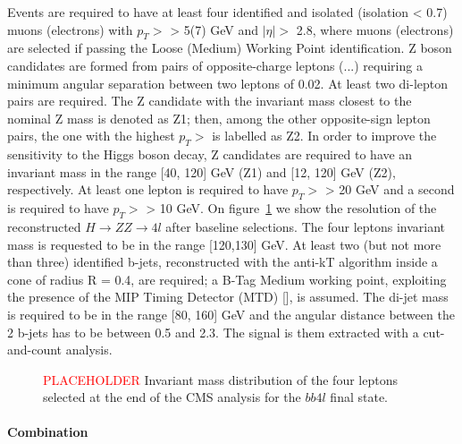 Events are required to have at least four identified and isolated (isolation < 0.7) muons (electrons) with $p_T >$ > 5(7) GeV and $|\eta| >$ 2.8, where muons (electrons) are selected if passing the Loose (Medium) Working Point identification. Z boson candidates are formed from pairs of opposite-charge leptons (...) requiring a minimum angular separation between two leptons of 0.02. At least two di-lepton pairs are required. The Z candidate with the invariant mass closest to the nominal Z mass is denoted as Z1; then, among the other opposite-sign lepton pairs, the one with the highest $p_T >$ is labelled as Z2. In order to improve the sensitivity to the Higgs boson decay, Z candidates are required to have an invariant mass in the range [40, 120] GeV (Z1) and [12, 120] GeV (Z2), respectively. At least one lepton is required to have $p_T >$ > 20 GeV and a second is required to have $p_T >$ > 10 GeV. On figure~\ref{fig:CMS_HH4l} we show the resolution of the reconstructed $H \rightarrow ZZ \rightarrow 4l$ after baseline selections. The four leptons invariant mass is requested to be in the range [120,130] GeV. At least two (but not more than three) identified b-jets, reconstructed with the anti-kT algorithm inside a cone of radius R = 0.4, are required; a B-Tag Medium working point, exploiting the presence of the MIP Timing Detector (MTD) [], is assumed. The di-jet mass is required to be in the range [80, 160] GeV and the angular distance between the 2 b-jets has to be between 0.5 and 2.3. The signal is them extracted with a cut-and-count analysis.

\begin{figure}[!htb]
\centering 
\caption{\textcolor{red}{PLACEHOLDER} Invariant mass distribution of the four leptons selected at the end of the CMS analysis for the $bb 4l$ final state.} 
\label{fig:CMS_HH4l} 
\end{figure}

\paragraph{Combination}